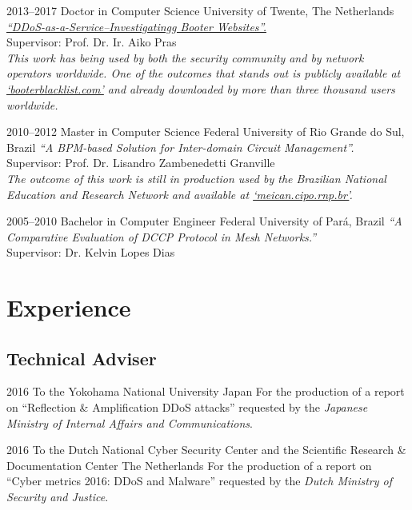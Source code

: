 \documentclass[print]{styles/friggeri-cv-mac} %
\begin{document}
\begin{entrylist}

\entry
{2013--2017}
{Doctor {\normalfont in Computer Science}}
{University of Twente, The Netherlands}
{\emph{\href{https://research.utwente.nl/files/18494043/jjsantanna_thesis.pdf}{``DDoS-as-a-Service--Investigatingg Booter Websites''.}} \\
Supervisor: Prof. Dr. Ir. Aiko Pras\\	
\textit{This work has being used by both the security community and by
network operators worldwide. One of the outcomes that stands out is publicly available at \href{http://booterblacklist.com}{`booterblacklist.com'} and  already downloaded by more than three thousand users worldwide.}}

\entry
{2010--2012}
{Master {\normalfont in Computer Science}}
{Federal University of Rio Grande do Sul, Brazil}
{\emph{``A BPM-based Solution for Inter-domain Circuit Management''.}\\
Supervisor: Prof. Dr. Lisandro Zambenedetti Granville\\
\textit{The outcome of this work is still in production used by the Brazilian
National Education and Research Network and available at
\href{http://meican.cipo.rnp.br/}{`meican.cipo.rnp.br'}.}}

\entry
{2005--2010}
{Bachelor {\normalfont in Computer Engineer}}
{Federal University of Par\'a, Brazil}
{\emph{``A Comparative Evaluation of DCCP Protocol in Mesh Networks.''} \\ 
Supervisor: Dr. Kelvin Lopes Dias
}

\end{entrylist}

\section{Experience}\vspace{-5pt}
\subsection{Technical Adviser}\vspace{-5pt}
\begin{entrylist}
\entry
{2016}
{To the Yokohama National University}
{Japan}
{For the production of a report on ``Reflection \& Amplification DDoS attacks''
requested by the \emph{Japanese Ministry of Internal Affairs and
Communications}.}

\entry
{2016}
{To the Dutch National Cyber Security Center and the Scientific Research \& Documentation Center}
{The Netherlands}
{For the production of a report on ``Cyber metrics 2016: DDoS and Malware''
requested by the \emph{Dutch Ministry of Security and Justice}.} \end{entrylist}
\end{document}
